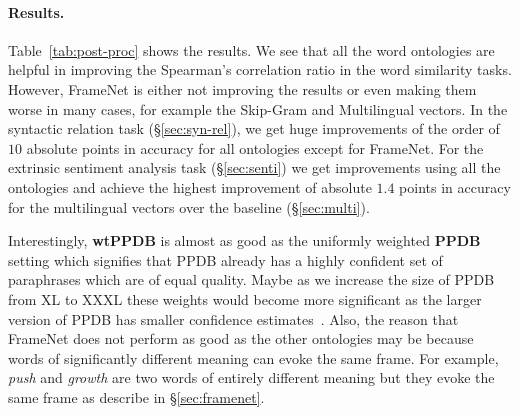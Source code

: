 \documentclass[11pt]{article}
\begin{document}
\paragraph{Results.} Table~\ref{tab:post-proc} shows the results.
We see that all the word ontologies are helpful in improving
the Spearman's correlation ratio in the word similarity tasks. However, FrameNet is
either not improving the results or even making them worse in many cases, for example the Skip-Gram and Multilingual vectors. In the syntactic relation task (\S\ref{sec:syn-rel}), we get huge improvements of the order of $10$ absolute points
in accuracy for all ontologies except for FrameNet. For the extrinsic sentiment analysis task (\S\ref{sec:senti}) we get improvements using all the ontologies and achieve the highest improvement of absolute $1.4$ points in accuracy for the multilingual vectors over the baseline (\S\ref{sec:multi}). 

Interestingly, \textbf{wtPPDB} is almost as good as the uniformly weighted \textbf{PPDB} setting which signifies that PPDB already has a highly confident
set of paraphrases which are of equal quality. Maybe as we increase the size of
PPDB from XL to XXXL these weights would become more significant as the larger
version of PPDB has smaller confidence estimates~\cite{ganitkevitch2013ppdb}. 
Also, the reason that FrameNet does not perform as good as the other 
ontologies may be because words of significantly different meaning can evoke the 
same frame. For example, \textit{push} and \textit{growth} are two words of 
entirely different meaning but they evoke the same frame as describe in \S\ref{sec:framenet}.
\end{document}
